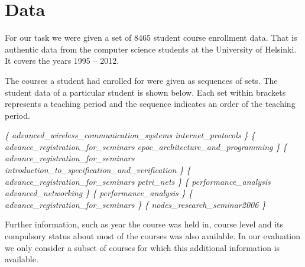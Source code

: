 \section{Data}


For our task we were given a set of 8465 student course enrollment data. 
That is authentic data from the computer science students at the University of Helsinki. 
It covers the years 1995 – 2012.

The courses a student had enrolled for were given as sequences of sets. 
The student data of a particular student is shown below. 
Each set within { } brackets represents a teaching period and the sequence indicates an order of the teaching period.

\textit{
\{ advanced\_wireless\_communication\_systems internet\_protocols \}
\{ advance\_registration\_for\_seminars epoc\_architecture\_and\_programming \}
\{ advance\_registration\_for\_seminars introduction\_to\_specification\_and\_verification \}
\{ advance\_registration\_for\_seminars petri\_nets \}
\{ performance\_analysis advanced\_networking \}
\{ performance\_analysis \}
\{ advance\_registration\_for\_seminars \}
\{ nodes\_research\_seminar2006 \}
}



Further information, such as year the course was held in,  course level and its compulsory status about most of the courses was also available. In our evaluation we only consider a subset of courses for which this additional information is available.
